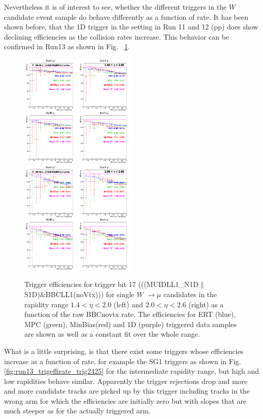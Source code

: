 Nevertheless it is of interest to see, whether the different triggers in the $W$
candidate event sample do behave differently as a function of rate. It has been
shown before, that the 1D trigger in the setting in Run 11 and 12 (pp) does show
declining efficiencies as the collision rates increase.  This behavior can be
confirmed in Run13 as shown in Fig.~ \ref{fig:run13_trigeffirate_trig17}. 

\begin{figure}[ht]
\begin{center}
\includegraphics[width=0.5\textwidth]{./figures/run13_trigeffirate_eta1_trig17_lin.png}
\includegraphics[width=0.5\textwidth]{./figures/run13_trigeffirate_eta2_trig17_lin.png}
\caption{\label{fig:run13_trigeffirate_trig17} Trigger efficiencies for trigger bit 17 (((MUIDLL1\_N1D$\|$S1D)\&BBCLL1(noVtx))) for single $W$ $\rightarrow \mu$ candidates in the rapidity range $ 1.4 < \eta < 2.0$ (left) and  $ 2.0 < \eta < 2.6$ (right) as a function of the raw BBCnovtx rate. The efficiencies for ERT (blue), MPC (green), MinBias(red) and 1D (purple) triggered data samples are shown as well as a constant fit over the whole range.}
\end{center}
\end{figure}

What is a little surprising, is that there exist some triggers whose
efficiencies increase as a function of rate, for example the SG1 triggers as
shown in Fig.~ \ref{fig:run13_trigeffirate_trig2425} for the intermediate
rapidity range, but high and low rapidities behave similar. Apparently the
trigger rejections drop and more and more candidate tracks are picked up by this
trigger including tracks in the wrong arm for which the efficiencies are
initially zero but with slopes that are much steeper as for the actually
triggered arm. 

